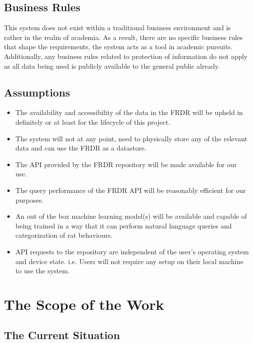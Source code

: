 \documentclass[12pt]{article}
\begin{document}
\subsection{Business Rules}

    \par{This system does not exist within a traditional business environment and is
    rather in the realm of academia. As a result, there are no specific business rules that shape
    the requirements, the system acts as a tool in academic pursuits. Additionally, any business rules
    related to protection of information do not apply as all data being used is publicly available to
    the general public already. }

\subsection{Assumptions}

\begin{itemize}
    \item The availability and accessibility of the data in the FRDR will be upheld in definitely or at least for the lifecycle of this project.
    \item The system will not at any point, need to physically store any of the relevant data and can use the FRDR as a datastore.
    \item The API provided by the FRDR repository will be made available for our use.
    \item The query performance of the FRDR API will be reasonably efficient for our purposes.
    \item An out of the box machine learning model(s) will be available and capable of being trained in a way that it can
    perform natural language queries and categorization of rat behaviours. 
    \item API requests to the repository are independent of the user's operating system and device state. i.e. Users
    will not require any setup on their local machine to use the system.

\end{itemize}


\section{The Scope of the Work}
\subsection{The Current Situation}
\end{document}
